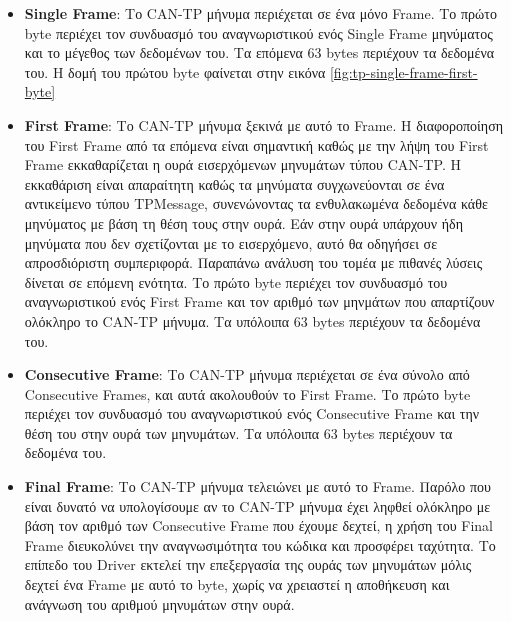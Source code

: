 \documentclass[a4paper,nobib,justified]{tufte-book}
\begin{document}
\begin{itemize}
	\item \textbf{Single Frame}: Το CAN-TP μήνυμα περιέχεται σε ένα μόνο Frame. Το πρώτο byte περιέχει τον συνδυασμό του αναγνωριστικού ενός Single Frame μηνύματος και το μέγεθος των δεδομένων του. Τα επόμενα 63 bytes περιέχουν τα δεδομένα του. Η δομή του πρώτου byte φαίνεται στην εικόνα \ref{fig:tp-single-frame-first-byte}
	\item \textbf{First Frame}: Το CAN-TP μήνυμα ξεκινά με αυτό το Frame. Η διαφοροποίηση του First Frame από τα επόμενα είναι σημαντική καθώς με την λήψη του First Frame εκκαθαρίζεται η ουρά εισερχόμενων μηνυμάτων τύπου CAN-TP. Η εκκαθάριση είναι απαραίτητη καθώς τα μηνύματα συγχωνεύονται σε ένα αντικείμενο τύπου TPMessage, συνενώνοντας τα ενθυλακωμένα δεδομένα κάθε μηνύματος με βάση τη θέση τους στην ουρά. Εάν στην ουρά υπάρχουν ήδη μηνύματα που δεν σχετίζονται με το εισερχόμενο, αυτό θα οδηγήσει σε απροσδιόριστη συμπεριφορά. Παραπάνω ανάλυση του τομέα με πιθανές λύσεις δίνεται σε επόμενη ενότητα. Το πρώτο byte περιέχει τον συνδυασμό του αναγνωριστικού ενός First Frame και τον αριθμό των μηνμάτων που απαρτίζουν ολόκληρο το CAN-TP μήνυμα. Τα υπόλοιπα 63 bytes περιέχουν τα δεδομένα του.
	\item \textbf{Consecutive Frame}: Το CAN-TP μήνυμα περιέχεται σε ένα σύνολο από Consecutive Frames, και αυτά ακολουθούν το First Frame. Το πρώτο byte περιέχει τον συνδυασμό του αναγνωριστικού ενός Consecutive Frame και την θέση του στην ουρά των μηνυμάτων. Τα υπόλοιπα 63 bytes περιέχουν τα δεδομένα του.
	\item \textbf{Final Frame}: Το CAN-TP μήνυμα τελειώνει με αυτό το Frame. Παρόλο που είναι δυνατό να υπολογίσουμε αν το CAN-TP μήνυμα έχει ληφθεί ολόκληρο με βάση τον αριθμό των Consecutive Frame που έχουμε δεχτεί, η χρήση του Final Frame διευκολύνει την αναγνωσιμότητα του κώδικα και προσφέρει ταχύτητα. Το επίπεδο του Driver εκτελεί την επεξεργασία της ουράς των μηνυμάτων μόλις δεχτεί ένα Frame με αυτό το byte, χωρίς να χρειαστεί η αποθήκευση και ανάγνωση του αριθμού μηνυμάτων στην ουρά. 
\end{itemize}
\end{document}
